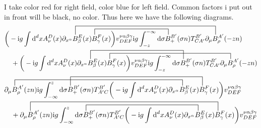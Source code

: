 I take color red for right field, color blue for left field. Common factors i put out in front will be black, no color.
Thus here we have the following diagrams.
{\color{red}
\begin{align}
	&\contraction[3ex]{\bigg(-\imag g \int \ddx xA_\nu^D(x) \partial_{x^\alpha}}{B}{_\beta^{E} (x) B_\gamma^F(x) \bigg) v^{\nu \alpha\beta\gamma}_{DEF}\imag g \int_{-z}^{-\infty} \dx \sigma B_+^{B'}(\sigma n) T^{B'}_{CA'}\partial_\mu}{B}
	\contraction[2ex]{\bigg(-\imag g \int \ddx xA_\nu^D(x) \partial_{x^\alpha} B_\beta^{E} (x) }{B}{_\gamma^F(x) \bigg) v^{\nu \alpha\beta\gamma}_{DEF}\imag g \int_{-z}^{-\infty} \dx \sigma }{B}
	\bigg(-\imag g \int \ddx xA_\nu^D(x) \partial_{x^\alpha} B_\beta^{E} (x) B_\gamma^F(x) \bigg) v^{\nu \alpha\beta\gamma}_{DEF}\imag g \int_{-z}^{-\infty} \dx \sigma B_+^{B'}(\sigma n) T^{B'}_{CA'}\partial_\mu B^{A'}_\rho (-zn) 
	\nl
	+
	\contraction[3ex]{\bigg(-\imag g \int \ddx xA_\nu^D(x) \partial_{x^\alpha}}{B}{_\beta^{E} (x) B_\gamma^F(x) \bigg) v^{\nu \alpha\beta\gamma}_{DEF}\imag g \int_{-z}^{-\infty} \dx \sigma}{B}
	\contraction[2ex]{\bigg(-\imag g \int \ddx xA_\nu^D(x) \partial_{x^\alpha} B_\beta^{E} (x)}{B}{_\gamma^F(x) \bigg) v^{\nu \alpha\beta\gamma}_{DEF}\imag g \int_{-z}^{-\infty} \dx \sigma B_+^{B'}(\sigma n) T^{B'}_{CA'}\partial_\mu}{B}
	\bigg(-\imag g \int \ddx xA_\nu^D(x) \partial_{x^\alpha} B_\beta^{E} (x) B_\gamma^F(x) \bigg) v^{\nu \alpha\beta\gamma}_{DEF}\imag g \int_{-z}^{-\infty} \dx \sigma B_+^{B'}(\sigma n) T^{B'}_{CA'}\partial_\mu B^{A'}_\rho (-zn)
\end{align}
}
{\color{blue}
\begin{align}
&\contraction[2ex]{\partial_\mu}{B}{^{A'}_\rho(zn) \imag g \int _{-\infty}^{z} \dx \sigma B_+^{B'}(\sigma n) T^{B'}_{A'C}\bigg(-\imag g \int \ddx xA_\nu^D(x) \partial_{x^\alpha}}{B}
\contraction[3ex]{\partial_\mu B^{A'}_\rho (zn) \imag g \int _{-\infty}^{z} \dx \sigma}{B}{_+^{B'}(\sigma n) T^{B'}_{A'C}\bigg(-\imag g \int \ddx xA_\nu^D(x) \partial_{x^\alpha} B_\beta^{E} (x) }{B}
\partial_\mu B^{A'}_\rho (zn) \imag g \int _{-\infty}^{z} \dx \sigma B_+^{B'}(\sigma n) T^{B'}_{A'C}\bigg(-\imag g \int \ddx xA_\nu^D(x) \partial_{x^\alpha} B_\beta^{E} (x) B_\gamma^F(x) \bigg) v^{\nu \alpha\beta\gamma}_{DEF}
\nl
+\contraction[3ex]{\partial_\mu}{B}{^{A'}_\rho (zn) \imag g \int _{-\infty}^{z} \dx \sigma B_+^{B'}(\sigma n) T^{B'}_{A'C}\bigg(-\imag g \int \ddx xA_\nu^D(x) \partial_{x^\alpha} B_\beta^{E} (x) }{B}
\contraction[2ex]{\partial_\mu B^{A'}_\rho (zn) \imag g \int _{-\infty}^{z} \dx \sigma}{B}{_+^{B'}(\sigma n) T^{B'}_{A'C}\bigg(-\imag g \int \ddx xA_\nu^D(x) \partial_{x^\alpha} }{B}
\partial_\mu B^{A'}_\rho (zn) \imag g \int _{-\infty}^{z} \dx \sigma B_+^{B'}(\sigma n) T^{B'}_{A'C}\bigg(-\imag g \int \ddx xA_\nu^D(x) \partial_{x^\alpha} B_\beta^{E} (x) B_\gamma^F(x) \bigg) v^{\nu \alpha\beta\gamma}_{DEF}
\end{align}
}
